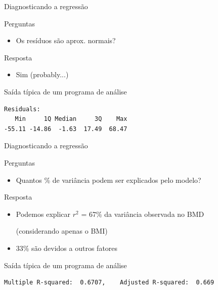 \documentclass{beamer}
\begin{document}
\begin{frame}[fragile]{\scriptsize Diagnosticando a regressão}
  \begin{block}{Perguntas}
    \footnotesize
    \begin{itemize}
      \footnotesize
    \item Os resíduos são aprox. normais?
    \end{itemize}
  \end{block}
  \bigskip
  \begin{exampleblock}{Resposta}
    \begin{itemize}
    \item Sim \hfill \footnotesize (probably...)
    \end{itemize}
  \end{exampleblock}
  \vfill
  \begin{exampleblock}{Saída típica de um programa de análise}
    \scriptsize
\begin{verbatim}
Residuals:
   Min     1Q Median     3Q    Max
-55.11 -14.86  -1.63  17.49  68.47
\end{verbatim}
\end{exampleblock}
\end{frame}

\begin{frame}[fragile]{\scriptsize Diagnosticando a regressão}
  \begin{block}{Perguntas}
    \footnotesize
    \begin{itemize}
      \footnotesize
    \item Quantos \% de variância podem ser explicados pelo modelo?
    \end{itemize}
  \end{block}
  \bigskip
  \begin{exampleblock}{Resposta}
    \begin{itemize}
      \footnotesize 
    \item Podemos explicar $r^2$ = 67\% da variância observada no BMD

      \scriptsize(considerando \alert{apenas} o BMI)
      \bigskip
    \item \scriptsize 33\% são devidos a outros fatores
    \end{itemize}
  \end{exampleblock}
  \vfill
  \begin{exampleblock}{Saída típica de um programa de análise}
    \scriptsize
\begin{verbatim}
Multiple R-squared:  0.6707,	Adjusted R-squared:  0.669
\end{verbatim}
\end{exampleblock}
\end{frame}
\end{document}
